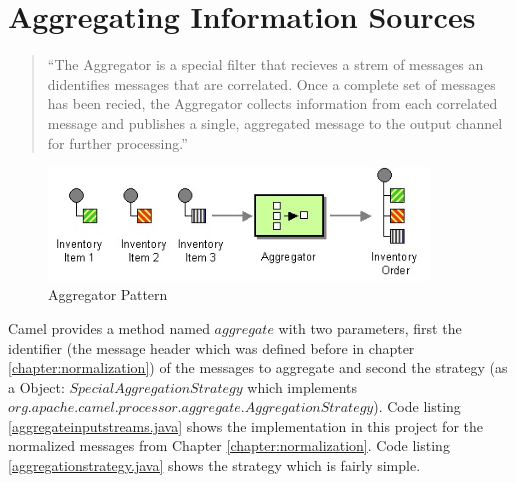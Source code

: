\documentclass[11pt,english,ngerman, headsepline]{scrreprt}
\begin{document}





\chapter{Aggregating Information Sources} 



\begin{quote}
``The Aggregator is a special filter that recieves a strem of messages an
didentifies messages that are correlated. Once a complete set of messages has
been recied, the Aggregator collects information from each correlated message
and publishes a single, aggregated message to the output channel for further
processing.'' \cite{hohpe2003enterprise}
\end{quote}

  \begin{figure}[h!]
	\begin{center}
	\includegraphics[width=0.9\textwidth]{pics/Aggregator.jpg}
	\end{center}
	\caption{Aggregator Pattern \cite{hohpe2003enterprise}}
	\label{utilityTree} 
   \end{figure}


Camel provides a method named $aggregate$ with two parameters, first the
identifier (the message header which was defined before in chapter
\ref{chapter:normalization}) of the messages to aggregate  and second the
strategy (as a Object: $SpecialAggregationStrategy$ which implements\\
$org.apache.camel.processor.aggregate.AggregationStrategy$). Code listing
\ref{aggregateinputstreams.java} shows the implementation in this project for
the normalized messages from Chapter \ref{chapter:normalization}. Code listing
\ref{aggregationstrategy.java} shows the strategy which is fairly simple.



\end{document}
